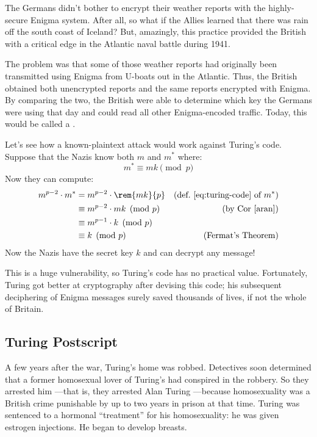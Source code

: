 The Germans didn't bother to encrypt their weather reports with the
highly-secure Enigma system.  After all, so what if the Allies learned
that there was rain off the south coast of Iceland?  But, amazingly, this
practice provided the British with a critical edge in the Atlantic naval
battle during 1941.

The problem was that some of those weather reports had originally been
transmitted using Enigma from U-boats out in the Atlantic.  Thus, the
British obtained both unencrypted reports and the same reports
encrypted with Enigma.  By comparing the two, the British were able to
determine which key the Germans were using that day and could read all
other Enigma-encoded traffic.  Today, this would be called a
.

Let's see how a known-plaintext attack would work against Turing's
code.  Suppose that the Nazis know both $m$ and $m^*$ where:
%
\[
m^* \equiv mk \pmod{p}
\]
%
Now they can compute:
%
\begin{align*}
m^{p-2} \cdot m^*
  & = m^{p-2} \cdot \rem{mk}{p}
                & \text{(def.~\eqref{eq:turing-code} of $m^*$)}\\
  & \equiv m^{p-2} \cdot mk \pmod{p} & \text{(by Cor~\ref{aran})}\\
  & \equiv m^{p-1} \cdot k \pmod{p}\\ %
  & \equiv k \pmod{p} & \text{(Fermat's Theorem)}
\end{align*}
%
Now the Nazis have the secret key $k$ and can decrypt any message!

This is a huge vulnerability, so Turing's code has no practical value.
Fortunately, Turing got better at cryptography after devising this
code; his subsequent deciphering of Enigma messages surely saved
thousands of lives, if not the whole of Britain.


\subsection{Turing Postscript}

A few years after the war, Turing's home was robbed.  Detectives soon
determined that a former homosexual lover of Turing's had conspired in
the robbery.  So they arrested him ---that is, they arrested Alan
Turing ---because homosexuality was a British crime punishable by up
to two years in prison at that time.  Turing was sentenced to a
hormonal ``treatment'' for his homosexuality: he was given estrogen
injections.  He began to develop breasts.

